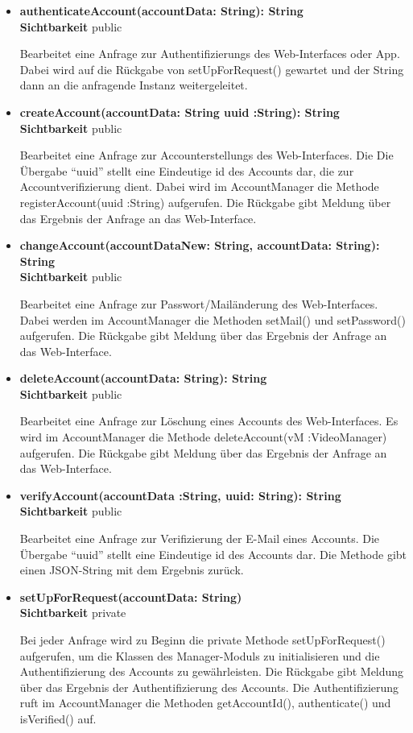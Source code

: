 \begin{itemize}
\item \textbf{authenticateAccount(accountData: String): String}\hfill\\
\textbf{Sichtbarkeit} public

Bearbeitet eine Anfrage zur Authentifizierungs des Web-Interfaces oder App. Dabei wird auf die Rückgabe von setUpForRequest() gewartet und der String dann an die anfragende Instanz weitergeleitet.

\item \textbf{createAccount(accountData: String uuid :String): String}\hfill\\
\textbf{Sichtbarkeit} public

Bearbeitet eine Anfrage zur Accounterstellungs des Web-Interfaces. Die Die Übergabe ``uuid'' stellt eine Eindeutige id des Accounts dar, die zur Accountverifizierung dient. Dabei wird im AccountManager die Methode registerAccount(uuid :String) aufgerufen. Die Rückgabe gibt Meldung über das Ergebnis der Anfrage an das Web-Interface.

\item \textbf{changeAccount(accountDataNew: String, accountData: String): String}\hfill\\
\textbf{Sichtbarkeit} public

Bearbeitet eine Anfrage zur Passwort/Mailänderung des Web-Interfaces. Dabei werden im AccountManager die Methoden setMail() und setPassword()  aufgerufen. Die Rückgabe gibt Meldung über das Ergebnis der Anfrage an das Web-Interface.

\item \textbf{deleteAccount(accountData: String): String}\hfill\\
\textbf{Sichtbarkeit} public

Bearbeitet eine Anfrage zur Löschung eines Accounts des Web-Interfaces. Es wird im AccountManager die Methode deleteAccount(vM :VideoManager) aufgerufen. Die Rückgabe gibt Meldung über das Ergebnis der Anfrage an das Web-Interface.

\item \textbf{verifyAccount(accountData :String, uuid: String): String}\hfill\\
\textbf{Sichtbarkeit} public

Bearbeitet eine Anfrage zur Verifizierung der E-Mail eines Accounts. Die Übergabe ``uuid'' stellt eine Eindeutige id des Accounts dar. Die Methode gibt einen JSON-String mit dem Ergebnis zurück.

\item \textbf{setUpForRequest(accountData: String)}\hfill\\
\textbf{Sichtbarkeit} private

Bei jeder Anfrage wird zu Beginn die private Methode setUpForRequest() aufgerufen, um die Klassen des Manager-Moduls zu initialisieren und die Authentifizierung des Accounts zu gewährleisten. Die Rückgabe gibt Meldung über das Ergebnis der Authentifizierung des Accounts. Die Authentifizierung ruft im AccountManager die Methoden getAccountId(), authenticate() und isVerified() auf.
\end{itemize}